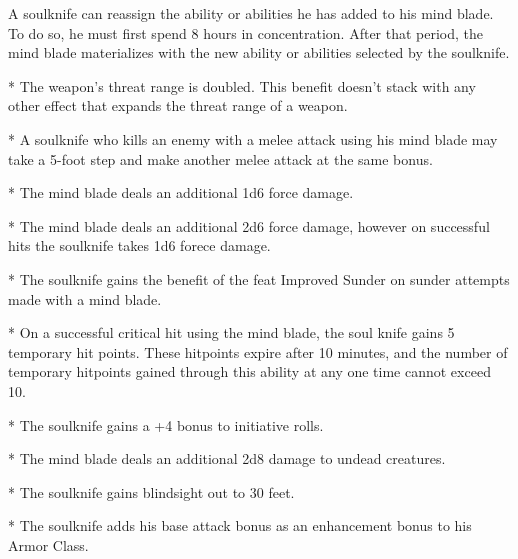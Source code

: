A soulknife can reassign the ability or abilities he has added to his mind blade. To do so, he must first spend 8 hours in concentration. After that period, the mind blade materializes with the new ability or abilities selected by the soulknife.

* The weapon's threat range is doubled. This benefit doesn't stack with any other effect that expands the threat range of a weapon.

* A soulknife who kills an enemy with a melee attack using his mind blade may take a 5-foot step and make another melee attack at the same bonus.

* The mind blade deals an additional 1d6 force damage.

* The mind blade deals an additional 2d6 force damage, however on successful hits the soulknife takes 1d6 forece damage.

* The soulknife gains the benefit of the feat Improved Sunder on sunder attempts made with a mind blade.

* On a successful critical hit using the mind blade, the soul knife gains 5 temporary hit points. These hitpoints expire after 10 minutes, and the number of temporary hitpoints gained through this ability at any one time cannot exceed 10.

* The soulknife gains a +4 bonus to initiative rolls.

* The mind blade deals an additional 2d8 damage to undead creatures.

* The soulknife gains blindsight out to 30 feet.

* The soulknife adds his base attack bonus as an enhancement bonus to his Armor Class.
